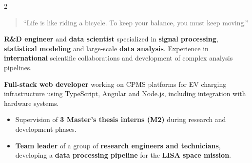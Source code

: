 \documentclass[8pt,a4paper,ragged2e,withhyper]{../_shared/altacv}
\begin{document}
\begin{paracol}{2}
{\divider\smallskip
\vspace{-.3cm}
{\small\LaTeXraggedright
{}
{\small{}
 
\par}}


\switchcolumn



\begin{quote}
``Life is like riding a bicycle. To keep your balance, you must keep moving.''
\end{quote}

{}

\textbf{R\&D engineer} and \textbf{data scientist} specialized in \textbf{signal processing}, \textbf{statistical modeling} and large-scale \textbf{data analysis}. Experience in \textbf{international} scientific collaborations and development of complex analysis pipelines. 

\textbf{Full-stack web developer} working on CPMS platforms for EV charging infrastructure using TypeScript, Angular and Node.js, including integration with hardware systems.


\begin{itemize}
  \item Supervision of \textbf{3 Master’s thesis interns (M2)} during research and development phases.
  \item \textbf{Team leader} of a group of \textbf{research engineers and technicians}, developing a \textbf{data processing pipeline} for the \textbf{LISA space mission}.
\end{itemize}


{}
\divider

}
\end{paracol}
\end{document}

